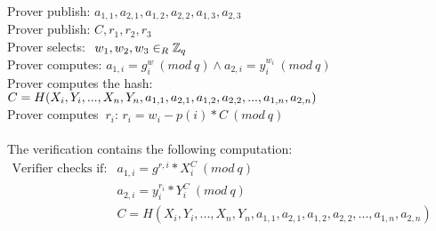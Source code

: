 \begin{infobox}
Prover publish: \begin{math}a_{1,1},a_{2,1},a_{1,2},a_{2,2},a_{1,3},a_{2,3}\end{math}\\
Prover publish: \begin{math}C,r_1,r_2,r_3 \end{math}\\
Prover selects: \begin{math}\ w_1, w_2,w_3\in_R \mathbb{Z}_q \end{math}\\
Prover computes: \begin{math}a_{1,i}=g^w_i \ (mod\ q) \land a_{2,i}=y_i^{w_i} \ (mod\ q) \end{math}\\
Prover computes the hash: \begin{math}C=H(X_i,Y_i,...,X_n,Y_n,a_{1,1},\\a_{2,1},a_{1,2},a_{2,2},...,a_{1,n},a_{2,n})\end{math}\\
Prover computes \begin{math}\ r_i \end{math}:  \begin{math}r_i=w_i-p(i) * C \ (mod\ q)\end{math}\\\\
The verification contains the following computation:\\

$
\begin{array}{ll}
 \text{Verifier checks if:}     &    a_{1,i} = g^{r,i}*X_i^C \ (mod\ q)         \\
                                &    a_{2,i}=y_i^{r_{i}} * Y_i^C \ (mod\ q)     \\
                                &   C=H(X_i,Y_i,...,X_n,Y_n,a_{1,1},a_{2,1},a_{1,2},a_{2,2},...,a_{1,n},a_{2,n})
\end{array}
$

\end{infobox}



